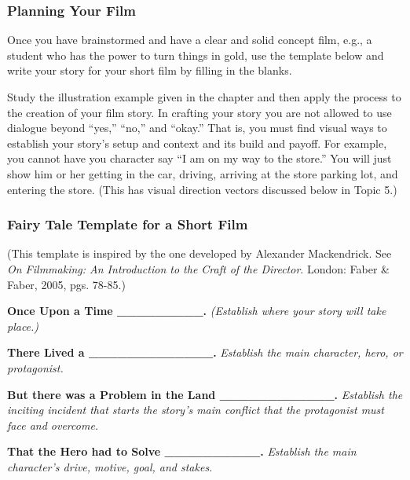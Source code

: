 \documentclass[
]{book}
\begin{document}
\begin{reflect}
\hypertarget{planning-your-film}{%
\subsubsection*{Planning Your Film}\label{planning-your-film}}

Once you have brainstormed and have a clear and solid concept film, e.g., a student who has the power to turn things in gold, use the template below and write your story for your short film by filling in the blanks.

Study the illustration example given in the chapter and then apply the process to the creation of your film story. In crafting your story you are not allowed to use dialogue beyond ``yes,'' ``no,'' and ``okay.'' That is, you must find visual ways to establish your story's setup and context and its build and payoff. For example, you cannot have you character say ``I am on my way to the store.'' You will just show him or her getting in the car, driving, arriving at the store parking lot, and entering the store. (This has visual direction vectors discussed below in Topic 5.)

\hypertarget{fairy-tale-template-for-a-short-film}{%
\subsubsection*{Fairy Tale Template for a Short Film}\label{fairy-tale-template-for-a-short-film}}

(This template is inspired by the one developed by Alexander Mackendrick. See \emph{On Filmmaking: An Introduction to the Craft of the Director}. London: Faber \& Faber, 2005, pgs. 78-85.)

\textbf{Once Upon a Time \_\_\_\_\_\_\_\_\_.}
\emph{(Establish where your story will take place.)}

\textbf{There Lived a \_\_\_\_\_\_\_\_\_\_\_\_\_.}
\emph{Establish the main character, hero, or protagonist.}

\textbf{But there was a Problem in the Land \_\_\_\_\_\_\_\_\_\_\_\_.}
\emph{Establish the inciting incident that starts the story's main conflict that the protagonist must face and overcome.}

\textbf{That the Hero had to Solve \_\_\_\_\_\_\_\_\_\_.}
\emph{Establish the main character's drive, motive, goal, and stakes.}


\end{reflect}
\end{document}
